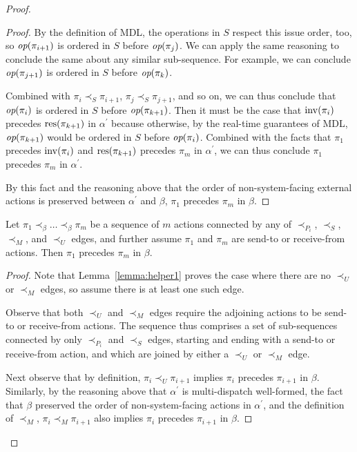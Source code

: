 \begin{proof}
\begin{proof}
      By the definition of MDL, the operations in $S$ respect this issue order, too, so $\operatorname*{\textit{op}}(\pi_{i+1})$ is ordered in $S$ before $\operatorname*{\textit{op}}(\pi_j)$. We can apply the same reasoning to conclude the same about any similar sub-sequence. For example, we can conclude $\operatorname*{\textit{op}}(\pi_{j+1})$ is ordered in $S$ before $\operatorname*{\textit{op}}(\pi_k)$.

      Combined with $\pi_i \prec_S \pi_{i+1}$, $\pi_j \prec_S \pi_{j+1}$, and so on, we can thus conclude that $\operatorname*{\textit{op}}(\pi_i)$ is ordered in $S$ before $\operatorname*{\textit{op}}(\pi_{k+1})$. Then it must be the case that $\operatorname{inv}(\pi_i)$ precedes $\operatorname{\operatorname{res}}(\pi_{k+1})$ in $\alpha^\prime$ because otherwise, by the real-time guarantees of MDL, $\operatorname*{\textit{op}}(\pi_{k+1})$ would be ordered in $S$ before $\operatorname*{\textit{op}}(\pi_i)$. Combined with the facts that $\pi_1$ precedes $\operatorname{inv}(\pi_i)$ and $\operatorname{\operatorname{res}}(\pi_{k+1})$ precedes $\pi_m$ in $\alpha^\prime$, we can thus conclude $\pi_1$ precedes $\pi_m$ in $\alpha^\prime$.

      By this fact and the reasoning above that the order of non-system-facing external actions is preserved between $\alpha^\prime$ and $\beta$, $\pi_1$ precedes $\pi_m$ in $\beta$.
  \end{proof}

  \begin{lem}
    Let $\pi_1 \prec_\beta \ldots \prec_\beta \pi_m$ be a sequence of $m$ actions connected by any of $\prec_{P_i}$, $\prec_S$, $\prec_M$, and $\prec_U$ edges, and further assume $\pi_1$ and $\pi_m$ are send-to or receive-from actions. Then $\pi_1$ precedes $\pi_m$ in $\beta$.
    \label{lemma:helper2}
  \end{lem}

  \begin{proof}
      Note that Lemma~\ref{lemma:helper1} proves the case where there are no $\prec_U$ or $\prec_M$ edges, so assume there is at least one such edge.

      Observe that both $\prec_U$ and $\prec_M$ edges require the adjoining actions to be send-to or receive-from actions. The sequence thus comprises a set of sub-sequences connected by only $\prec_{P_i}$ and $\prec_S$ edges, starting and ending with a send-to or receive-from action, and which are joined by either a $\prec_U$ or $\prec_M$ edge. 
	
      Next observe that by definition, $\pi_i \prec_U \pi_{i+1}$ implies $\pi_i$ precedes $\pi_{i+1}$ in $\beta$. Similarly, by the reasoning above that $\alpha^\prime$ is multi-dispatch well-formed, the fact that $\beta$ preserved the order of non-system-facing actions in $\alpha^\prime$, and the definition of $\prec_M$, $\pi_i \prec_M \pi_{i+1}$ also implies $\pi_i$ precedes $\pi_{i+1}$ in $\beta$.
	

\end{proof}
\end{proof}

